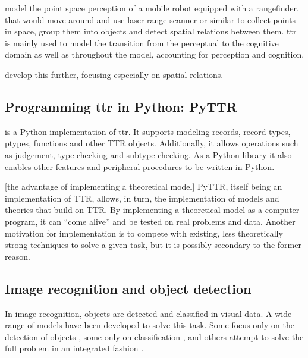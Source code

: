 \cite{DobnikModellinglanguageaction2012}

\cite{lspc} model the point space perception of a mobile robot equipped with a rangefinder.
 that would move around and use laser range scanner or similar to collect points in space, group them into objects and detect spatial relations between them.
\Gls{ttr} is mainly used to model the transition from the perceptual to the cognitive domain as well as 
 throughout the model, accounting for perception and cognition.

\cite{ttrspat} develop this further, focusing especially on spatial relations.

\cite{LarssonFormalsemanticsperceptual2015}



\subsection{Programming \acrshort{ttr} in Python: PyTTR}

\cite{pyttr} is a Python implementation of \gls{ttr}.
It supports modeling records, record types, ptypes, functions and other TTR objects.
Additionally, it allows operations such as judgement, type checking and subtype checking.
As a Python library it also enables other features and peripheral procedures to be written in Python.

[the advantage of implementing a theoretical model]
PyTTR, itself being an implementation of TTR, allows, in turn, the implementation of models and theories that build on TTR.
By implementing a theoretical model as a computer program, it can ``come alive'' and be tested on real problems and data.
Another motivation for implementation is to compete with existing, less theoretically strong techniques to solve a given task, but it is possibly secondary to the former reason.




\subsection{Image recognition and object detection}

In image recognition, objects are detected and classified in visual data.
A wide range of models have been developed to solve this task.
Some focus only on the detection of objects \citep{BlaschkoLearningLocalizeObjects2008}, some only on classification \citep[ResNet,][]{HeDeepResidualLearning2015}, and others attempt to solve the full problem in an integrated fashion \citep{RedmonYouOnlyLook2015,HeMaskRCNN2017}.

